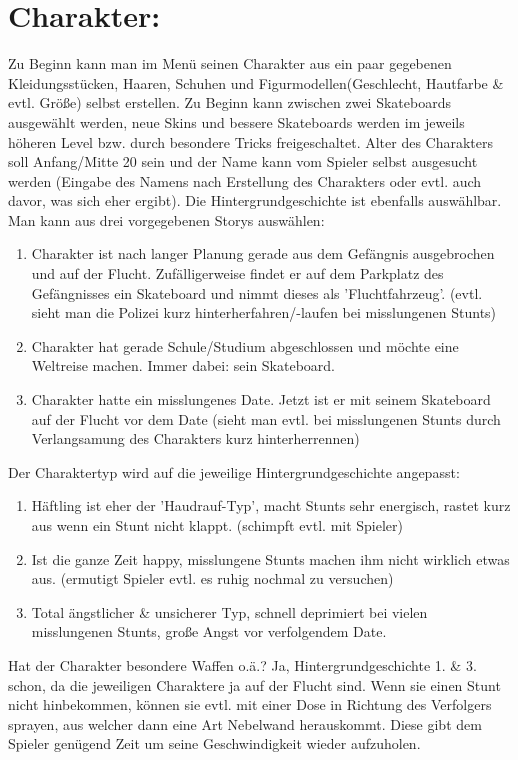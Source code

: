 \documentclass[paper=a4,fontsize=12pt,ngerman]{scrartcl}
\begin{document}
\section{Charakter:}
Zu Beginn kann man im Menü seinen Charakter aus ein paar gegebenen Kleidungsstücken,
Haaren, Schuhen und Figurmodellen(Geschlecht, Hautfarbe \& evtl. Größe) selbst erstellen.
Zu Beginn kann zwischen zwei Skateboards ausgewählt werden, neue
Skins und bessere Skateboards werden im jeweils höheren Level bzw. durch besondere
Tricks freigeschaltet. Alter des Charakters soll Anfang/Mitte 20 sein und der Name kann vom
Spieler selbst ausgesucht werden (Eingabe des Namens nach
Erstellung des Charakters oder evtl. auch davor, was sich eher ergibt).
Die Hintergrundgeschichte ist ebenfalls auswählbar. Man kann aus drei vorgegebenen
Storys auswählen:
\begin{enumerate}
	\item Charakter ist nach langer Planung gerade aus dem Gefängnis ausgebrochen
	und auf der Flucht. Zufälligerweise findet er auf dem Parkplatz des Gefängnisses ein
	Skateboard und nimmt dieses als 'Fluchtfahrzeug'. (evtl. sieht man die
	Polizei kurz hinterherfahren/-laufen bei misslungenen Stunts)
	\item Charakter hat gerade Schule/Studium abgeschlossen und möchte eine
	Weltreise machen. Immer dabei: sein Skateboard.
	\item  Charakter hatte ein misslungenes Date. Jetzt ist er mit seinem Skateboard auf
	der Flucht vor dem Date (sieht man evtl. bei misslungenen Stunts durch Verlangsamung des
	Charakters kurz hinterherrennen)
\end{enumerate}
Der Charaktertyp wird auf die jeweilige Hintergrundgeschichte angepasst:

\begin{enumerate}
	\item Häftling ist eher der 'Haudrauf-Typ', macht Stunts sehr energisch, rastet kurz
aus wenn ein Stunt nicht klappt. (schimpft evtl. mit Spieler)
	\item Ist die ganze Zeit happy, misslungene Stunts machen ihm nicht wirklich etwas aus.
(ermutigt Spieler evtl. es ruhig nochmal zu versuchen)
	\item Total ängstlicher \& unsicherer Typ, schnell deprimiert bei vielen misslungenen
Stunts, große Angst vor verfolgendem Date.
\end{enumerate}

Hat der Charakter besondere Waffen o.ä.? Ja, Hintergrundgeschichte 1. \& 3. schon, da die
jeweiligen Charaktere ja auf der Flucht sind. Wenn sie einen Stunt nicht hinbekommen,
können sie evtl. mit einer Dose in Richtung des Verfolgers sprayen,
aus welcher dann eine Art Nebelwand herauskommt. Diese gibt dem Spieler genügend Zeit
um seine Geschwindigkeit wieder aufzuholen.
\clearpage
\end{document}
